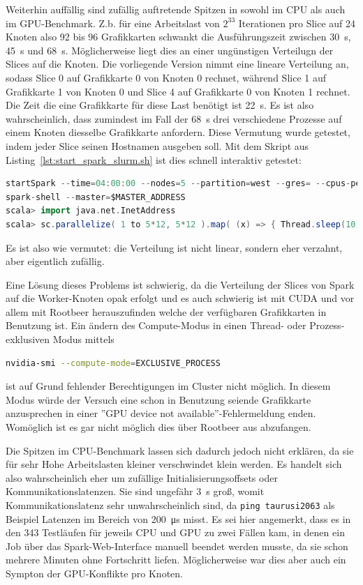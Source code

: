 \documentclass[german,bibnum,beleg,zihtitle,german,hyperref,utf8]{zihpub}
\begin{document}
Weiterhin auffällig sind zufällig auftretende Spitzen in sowohl im CPU als auch im GPU-Benchmark. Z.b. für eine Arbeitslast von $2^33$ Iterationen pro Slice auf 24 Knoten also 92 bis 96 Grafikkarten schwankt die Ausführungszeit zwischen \SI{30}{\second}, \SI{45}{\second} und \SI{68}{\second}. Möglicherweise liegt dies an einer ungünstigen Verteilugn der Slices auf die Knoten. Die vorliegende Version nimmt eine lineare Verteilung an, sodass Slice 0 auf Grafikkarte 0 von Knoten 0 rechnet, während Slice 1 auf Grafikkarte 1 von Knoten 0 und Slice 4 auf Grafikkarte 0 von Knoten 1 rechnet. Die Zeit die eine Grafikkarte für diese Last benötigt ist \SI{22}{\second}. Es ist also wahrscheinlich, dass zumindest im Fall der \SI{68}{\second} drei verschiedene Prozesse auf einem Knoten diesselbe Grafikkarte anfordern. Diese Vermutung wurde getestet, indem jeder Slice seinen Hostnamen ausgeben soll. Mit dem Skript aus Listing~\ref{lst:start_spark_slurm.sh} ist dies schnell interaktiv getestet:
\begin{lstlisting}[language=scala]
startSpark --time=04:00:00 --nodes=5 --partition=west --gres= --cpus-per-task=12
spark-shell --master=$MASTER_ADDRESS
scala> import java.net.InetAddress
scala> sc.parallelize( 1 to 5*12, 5*12 ).map( (x) => { Thread.sleep(10); x+" : "+InetAddress.getLocalHost().getHostName() } ).collect().foreach( println )
\end{lstlisting}\vspace{-1.5\baselineskip}
Es ist also wie vermutet: die Verteilung ist nicht linear, sondern eher verzahnt, aber eigentlich zufällig.

Eine Lösung dieses Problems ist schwierig, da die Verteilung der Slices von Spark auf die Worker-Knoten opak erfolgt und es auch schwierig ist mit CUDA und vor allem mit Rootbeer herauszufinden welche der verfügbaren Grafikkarten in Benutzung ist. Ein ändern des Compute-Modus in einen Thread- oder Prozess-exklusiven Modus mittels
\begin{lstlisting}[language=bash]
nvidia-smi --compute-mode=EXCLUSIVE_PROCESS
\end{lstlisting}
ist auf Grund fehlender Berechtigungen im Cluster nicht möglich. In diesem Modus würde der Versuch eine schon in Benutzung seiende Grafikkarte anzusprechen in einer ''GPU device not available''-Fehlermeldung enden. Womöglich ist es gar nicht möglich dies über Rootbeer aus abzufangen.

Die Spitzen im CPU-Benchmark lassen sich dadurch jedoch nicht erklären, da sie für sehr Hohe Arbeitslasten kleiner verschwindet klein werden. Es handelt sich also wahrscheinlich eher um zufällige Initialisierungsoffsets oder Kommunikationslatenzen. Sie sind ungefähr \SI{3}{\second} groß, womit Kommunikationslatenz sehr unwahrscheinlich sind, da \lstinline!ping taurusi2063! als Beispiel Latenzen im Bereich von \SI{200}{\micro\second} misst. Es sei hier angemerkt, dass es in den 343 Testläufen für jeweils CPU und GPU zu zwei Fällen kam, in denen ein Job über das Spark-Web-Interface manuell beendet werden musste, da sie schon mehrere Minuten ohne Fortschritt liefen. Möglicherweise war dies aber auch ein Sympton der GPU-Konflikte pro Knoten.
\end{document}
